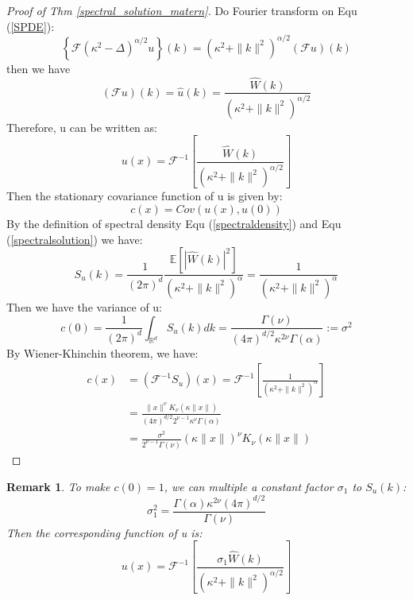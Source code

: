 \documentclass{article}
\newtheorem{remark}{Remark}
\begin{document}
\begin{proof}[Proof of Thm \ref{spectral_solution_matern}]
	Do Fourier transform on Equ (\ref{SPDE}):
\begin{equation}
	\left\{\mathcal{F}(\kappa^2 - \Delta)^{\alpha/2} u\right\}(k) = (\kappa^2 + \|k\|^2)^{\alpha/2}(\mathcal{F}u)(k)
\end{equation}
then we have 
\begin{equation}\label{spectralsolution}
	(\mathcal{F}u)(k) = \hat{u}(k) = \frac{\hat{W}(k)}{(\kappa^2 + \|k\|^2)^{\alpha/2}} 
\end{equation}
Therefore, u can be written as:
\begin{equation}
	u(x) = \mathcal{F}^{-1}\left[\frac{\hat{W}(k)}{(\kappa^2 + \|k\|^2)^{\alpha/2}}\right]
\end{equation}
Then the stationary covariance function of u is given by:
\begin{equation}
	c(x) = Cov(u(x), u(0))
\end{equation}
By the definition of spectral density Equ (\ref{spectraldensity}) and Equ (\ref{spectralsolution}) we have:
\begin{equation}\label{Suk}
		S_u(k) = \frac{1}{(2\pi)^{d}}\frac{\mathbb{E}\left[\left|\hat{W}(k)\right|^2\right]}{(\kappa^2 + \|k\|^2)^{\alpha}} 
		= \frac{1}{(\kappa^2 + \|k\|^2)^{\alpha}} 
\end{equation}
Then we have the variance of u:
\begin{equation}
	c(0) = \frac{1}{(2\pi)^{d}}\int_{\mathbb{R}^d} S_u(k) dk = \frac{\Gamma(\nu)}{(4\pi)^{d/2}\kappa^{2\nu}\Gamma(\alpha) }:=\sigma^2
\end{equation}
	By Wiener-Khinchin theorem, we have:
\begin{equation}
	\begin{aligned}
		c(x) &= (\mathcal{F}^{-1}S_u)(x)=\mathcal{F}^{-1}\left[\frac{1}{(\kappa^2 + \|k\|^2)^{\alpha}}\right]\\
		&= \frac{\|x\|^\nu K_{\nu}(\kappa\|x\|)}{(4\pi)^{d/2}2^{\nu-1}\kappa^{\nu}\Gamma(\alpha)}\\
		& = \frac{\sigma^2}{2^{\nu -1}\Gamma(\nu)}(\kappa \|x\|)^\nu K_\nu (\kappa \|x\|)
	\end{aligned}
\end{equation}
\end{proof}
\begin{remark}
	To make $c(0) = 1$, we can multiple a constant factor $\sigma_1$ to $S_u(k)$:
	\begin{equation}
		\sigma_1^2 = \frac{\Gamma(\alpha) \kappa^{2\nu}(4\pi)^{d/2}}{\Gamma(\nu)}
	\end{equation}
	Then the corresponding function of u is:
	\begin{equation}
		u(x) = \mathcal{F}^{-1}\left[\frac{\sigma_1\hat{W}(k)}{(\kappa^2 + \|k\|^2)^{\alpha/2}}\right]
	\end{equation}
\end{remark}
\end{document}
